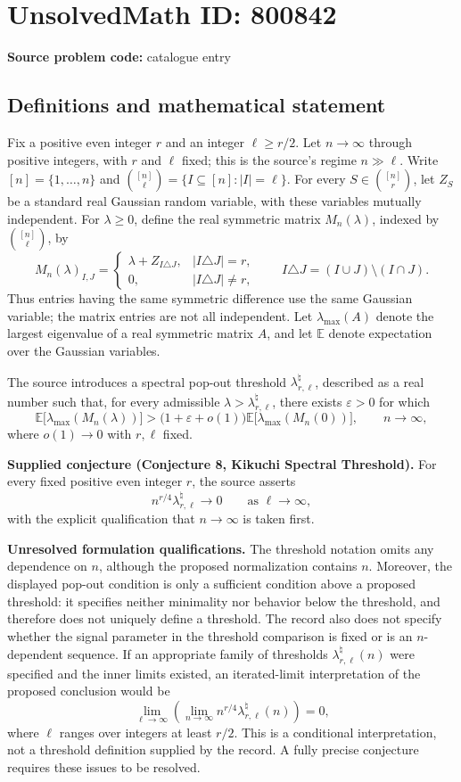 \documentclass[11pt]{article}
\begin{document}
\section*{UnsolvedMath ID: 800842}
\textbf{Source problem code:} catalogue entry
\subsection{Definitions and mathematical statement}
Fix a positive even integer \(r\) and an integer \(\ell\ge r/2\). Let \(n\to\infty\) through positive integers, with \(r\) and \(\ell\) fixed; this is the source's regime \(n\gg\ell\). Write \([n]=\{1,\ldots,n\}\) and \(\binom{[n]}{\ell}=\{I\subseteq[n]:|I|=\ell\}\). For every \(S\in\binom{[n]}{r}\), let \(Z_S\) be a standard real Gaussian random variable, with these variables mutually independent. For \(\lambda\ge0\), define the real symmetric matrix \(M_n(\lambda)\), indexed by \(\binom{[n]}{\ell}\), by
\[
M_n(\lambda)_{I,J}=\begin{cases}
\lambda+Z_{I\triangle J},&|I\triangle J|=r,\\
0,&|I\triangle J|\ne r,
\end{cases}
\qquad I\triangle J=(I\cup J)\setminus(I\cap J).
\]
Thus entries having the same symmetric difference use the same Gaussian variable; the matrix entries are not all independent. Let \(\lambda_{\max}(A)\) denote the largest eigenvalue of a real symmetric matrix \(A\), and let \(\mathbb E\) denote expectation over the Gaussian variables.

The source introduces a spectral pop-out threshold \(\lambda^\natural_{r,\ell}\), described as a real number such that, for every admissible \(\lambda>\lambda^\natural_{r,\ell}\), there exists \(\varepsilon>0\) for which
\[
\mathbb E\bigl[\lambda_{\max}(M_n(\lambda))\bigr]
>
\bigl(1+\varepsilon+o(1)\bigr)
\mathbb E\bigl[\lambda_{\max}(M_n(0))\bigr],
\qquad n\to\infty,
\]
where \(o(1)\to0\) with \(r,\ell\) fixed.

\textbf{Supplied conjecture (Conjecture 8, Kikuchi Spectral Threshold).} For every fixed positive even integer \(r\), the source asserts
\[
n^{r/4}\lambda^\natural_{r,\ell}\longrightarrow0
\qquad\text{as }\ell\to\infty,
\]
with the explicit qualification that \(n\to\infty\) is taken first.

\textbf{Unresolved formulation qualifications.} The threshold notation omits any dependence on \(n\), although the proposed normalization contains \(n\). Moreover, the displayed pop-out condition is only a sufficient condition above a proposed threshold: it specifies neither minimality nor behavior below the threshold, and therefore does not uniquely define a threshold. The record also does not specify whether the signal parameter in the threshold comparison is fixed or is an \(n\)-dependent sequence. If an appropriate family of thresholds \(\lambda^\natural_{r,\ell}(n)\) were specified and the inner limits existed, an iterated-limit interpretation of the proposed conclusion would be
\[
\lim_{\ell\to\infty}\left(\lim_{n\to\infty}
 n^{r/4}\lambda^\natural_{r,\ell}(n)\right)=0,
\]
where \(\ell\) ranges over integers at least \(r/2\). This is a conditional interpretation, not a threshold definition supplied by the record. A fully precise conjecture requires these issues to be resolved.
\end{document}
